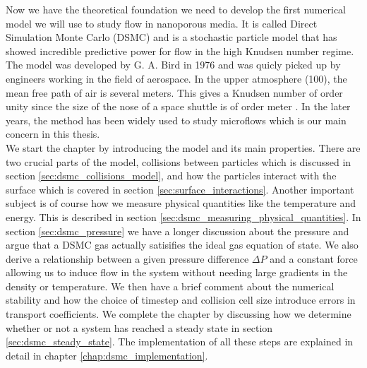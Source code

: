 Now we have the theoretical foundation we need to develop the first numerical model we will use to study flow in nanoporous media. It is called Direct Simulation Monte Carlo (DSMC) and is a stochastic particle model that has showed incredible predictive power for flow in the high Knudsen number regime. The model was developed by G. A. Bird in 1976 and was quicly picked up by engineers working in the field of aerospace. In the upper atmosphere (\unit{100}{\kilo\meter}), the mean free path of air is several meters. This gives a Knudsen number of order unity since the size of the nose of a space shuttle is of order meter \cite{alexander1997direct}. In the later years, the method has been widely used to study microflows which is our main concern in this thesis.\\
We start the chapter by introducing the model and its main properties. There are two crucial parts of the model, collisions between particles which is discussed in section \ref{sec:dsmc_collisions_model}, and how the particles interact with the surface which is covered in section \ref{sec:surface_interactions}. Another important subject is of course how we measure physical quantities like the temperature and energy. This is described in section \ref{sec:dsmc_measuring_physical_quantities}. In section \ref{sec:dsmc_pressure} we have a longer discussion about the pressure and argue that a DSMC gas actually satisifies the ideal gas equation of state. We also derive a relationship between a given pressure difference $\Delta P$ and a constant force allowing us to induce flow in the system without needing large gradients in the density or temperature. We then have a brief comment about the numerical stability and how the choice of timestep and collision cell size introduce errors in transport coefficients. We complete the chapter by discussing how we determine whether or not a system has reached a steady state in section \ref{sec:dsmc_steady_state}. The implementation of all these steps are explained in detail in chapter \ref{chap:dsmc_implementation}.